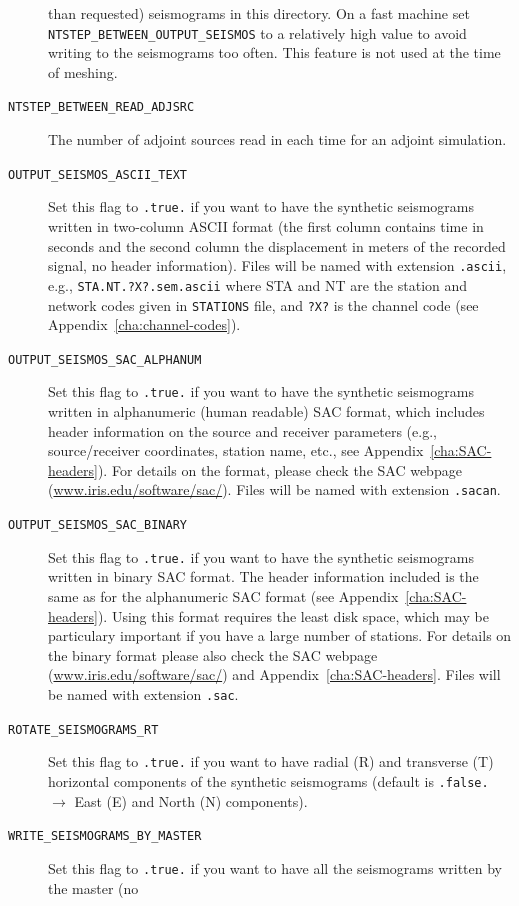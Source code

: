 \documentclass[oneside,english]{book}
\newcommand{\urlwithparentheses}[1]{(\url{#1})}
\begin{document}
\begin{description}
than requested) seismograms in this directory. On a fast machine set
\texttt{NTSTEP\_BETWEEN\_OUTPUT\_SEISMOS} to a relatively high value
to avoid writing to the seismograms too often. This feature is not
used at the time of meshing.
\item [{\texttt{NTSTEP\_BETWEEN\_READ\_ADJSRC}}] The number of adjoint
sources read in each time for an adjoint simulation.
\item [{\texttt{OUTPUT\_SEISMOS\_ASCII\_TEXT}}] Set this flag to \texttt{.true.}
if you want to have the synthetic seismograms written in two-column
ASCII format (the first column contains time in seconds and the second
column the displacement in meters of the recorded signal, no header
information). Files will be named with extension \texttt{.ascii}, e.g., \texttt{STA.NT.?X?.sem.ascii} where STA and NT are the station and network codes given in \texttt{STATIONS} file, and \texttt{?X?} is the channel code (see Appendix~\ref{cha:channel-codes}).
\item [{\texttt{OUTPUT\_SEISMOS\_SAC\_ALPHANUM}}] Set this flag to \texttt{.true.}
if you want to have the synthetic seismograms written in alphanumeric
(human readable) SAC format, which includes header information on
the source and receiver parameters (e.g., source/receiver coordinates,
station name, etc., see Appendix~\ref{cha:SAC-headers}). For details on the format, please check the SAC webpage \urlwithparentheses{www.iris.edu/software/sac/}. Files will be named with extension \texttt{.sacan}.
\item [{\texttt{OUTPUT\_SEISMOS\_SAC\_BINARY}}] Set this flag to \texttt{.true.}
if you want to have the synthetic seismograms written in binary SAC
format. The header information included is the same as for the alphanumeric
SAC format (see Appendix~\ref{cha:SAC-headers}). Using this format requires the least disk space, which may be particulary important if you have a large number of stations.
For details on the binary format please also check the SAC webpage \urlwithparentheses{www.iris.edu/software/sac/} and Appendix~\ref{cha:SAC-headers}. Files will be named with extension \texttt{.sac}.
\item [{\texttt{ROTATE\_SEISMOGRAMS\_RT}}] Set this flag to \texttt{.true.}
if you want to have radial (R) and transverse (T) horizontal components
of the synthetic seismograms (default is \texttt{.false.} $\rightarrow$
East (E) and North (N) components).
\item [{\texttt{WRITE\_SEISMOGRAMS\_BY\_MASTER}}] Set this flag to \texttt{.true.}
if you want to have all the seismograms written by the master (no

\end{description}
\end{document}

